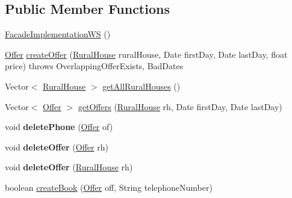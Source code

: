 \subsection*{Public Member Functions}
\begin{DoxyCompactItemize}
\item 
\mbox{\hyperlink{classbusiness_logic_1_1_facade_implementation_w_s_a22415eec1f4d0a160f02cfdc1ac80825}{Facade\+Implementation\+WS}} ()
\item 
\mbox{\hyperlink{classdomain_1_1_offer}{Offer}} \mbox{\hyperlink{classbusiness_logic_1_1_facade_implementation_w_s_ac7b3bdfd0815ea7c787da312de594cce}{create\+Offer}} (\mbox{\hyperlink{classdomain_1_1_rural_house}{Rural\+House}} rural\+House, Date first\+Day, Date last\+Day, float price)  throws Overlapping\+Offer\+Exists, Bad\+Dates 
\item 
Vector$<$ \mbox{\hyperlink{classdomain_1_1_rural_house}{Rural\+House}} $>$ \mbox{\hyperlink{classbusiness_logic_1_1_facade_implementation_w_s_aa6f21ddb40ca6cd752a13e31ff016e7e}{get\+All\+Rural\+Houses}} ()
\item 
Vector$<$ \mbox{\hyperlink{classdomain_1_1_offer}{Offer}} $>$ \mbox{\hyperlink{classbusiness_logic_1_1_facade_implementation_w_s_a7489fb15fdb8206b16daf6ed24fdfea0}{get\+Offers}} (\mbox{\hyperlink{classdomain_1_1_rural_house}{Rural\+House}} rh, Date first\+Day, Date last\+Day)
\item 
\mbox{\label{classbusiness_logic_1_1_facade_implementation_w_s_ab3efd0077bc3ffd21e78cf2fb9f8709c}} 
void {\bfseries delete\+Phone} (\mbox{\hyperlink{classdomain_1_1_offer}{Offer}} of)
\item 
\mbox{\label{classbusiness_logic_1_1_facade_implementation_w_s_a7d5bca5ebc3d420813ce40e0b47cfef9}} 
void {\bfseries delete\+Offer} (\mbox{\hyperlink{classdomain_1_1_offer}{Offer}} rh)
\item 
\mbox{\label{classbusiness_logic_1_1_facade_implementation_w_s_a109173565a7d95250d9136e9540c13b9}} 
void {\bfseries delete\+Offer} (\mbox{\hyperlink{classdomain_1_1_rural_house}{Rural\+House}} rh)
\item 
boolean \mbox{\hyperlink{classbusiness_logic_1_1_facade_implementation_w_s_a89aa08f9fe033c295d7fcf0cb5571882}{create\+Book}} (\mbox{\hyperlink{classdomain_1_1_offer}{Offer}} off, String telephone\+Number)

\end{DoxyCompactItemize}
